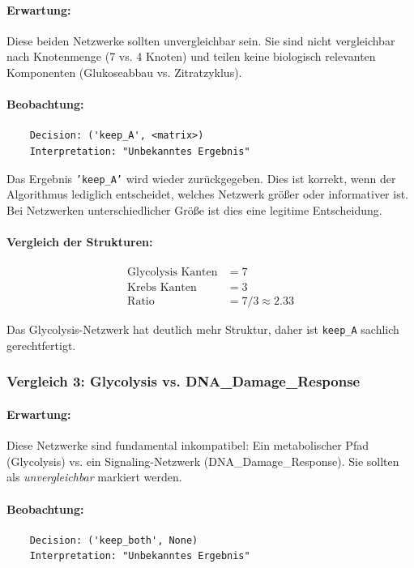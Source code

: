 ﻿\documentclass[a4paper,12pt]{article}
\theoremstyle{definition}
\begin{document}
\paragraph{Erwartung:}
Diese beiden Netzwerke sollten unvergleichbar sein. Sie sind nicht vergleichbar nach Knotenmenge (7 vs. 4 Knoten) und teilen keine biologisch relevanten Komponenten (Glukoseabbau vs. Zitratzyklus).

\paragraph{Beobachtung:}
\begin{verbatim}
	Decision: ('keep_A', <matrix>)
	Interpretation: "Unbekanntes Ergebnis"
\end{verbatim}

Das Ergebnis \texttt{'keep\_A'} wird wieder zurückgegeben. Dies ist korrekt, wenn der Algorithmus lediglich entscheidet, welches Netzwerk größer oder informativer ist. Bei Netzwerken unterschiedlicher Größe ist dies eine legitime Entscheidung.

\paragraph{Vergleich der Strukturen:}
\begin{align*}
	\text{Glycolysis Kanten} &= 7 \\
	\text{Krebs Kanten} &= 3 \\
	\text{Ratio} &= 7/3 \approx 2.33
\end{align*}

Das Glycolysis-Netzwerk hat deutlich mehr Struktur, daher ist \texttt{keep\_A} sachlich gerechtfertigt.

\subsubsection{Vergleich 3: Glycolysis vs. DNA\_Damage\_Response}

\paragraph{Erwartung:}
Diese Netzwerke sind fundamental inkompatibel: Ein metabolischer Pfad (Glycolysis) vs. ein Signaling-Netzwerk (DNA\_Damage\_Response). Sie sollten als \textit{unvergleichbar} markiert werden.

\paragraph{Beobachtung:}
\begin{verbatim}
	Decision: ('keep_both', None)
	Interpretation: "Unbekanntes Ergebnis"
\end{verbatim}
\end{document}
